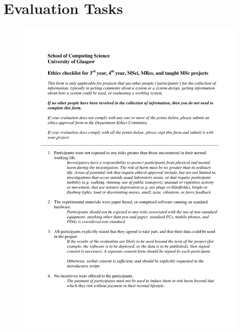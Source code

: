 \documentclass{mproj}
\begin{document}
\chapter{Evaluation Tasks}\label{tasks}



\begin{figure}[h]
	\centering
	\includegraphics[width=\textwidth]{images/ethics_form1}
\end{figure}
\end{document}

